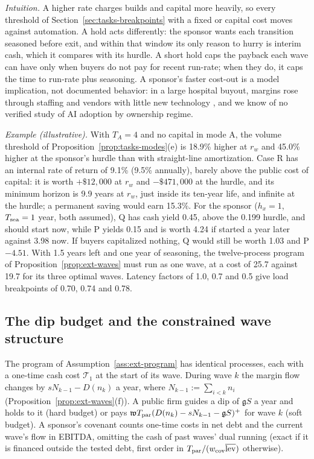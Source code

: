 \noindent\emph{Intuition.} A higher rate charges builds and capital more heavily, so every threshold of Section~\ref{sec:tasks-breakpoints} with a fixed or capital cost moves against automation. A hold acts differently: the sponsor wants each transition seasoned before exit, and within that window its only reason to hurry is interim cash, which it compares with its hurdle. A short hold caps the payback each wave can have only when buyers do not pay for recent run-rate; when they do, it caps the time to run-rate plus seasoning. A sponsor's faster cost-out is a model implication, not documented behavior: in a large hospital buyout, margins rose through staffing and vendors with little new technology \citep{richards2024managing}, and we know of no verified study of AI adoption by ownership regime.

\noindent\emph{Example (illustrative).} With $T_A=4$ and no capital in mode A, the volume threshold of Proposition~\ref{prop:tasks-modes}(e) is 18.9\% higher at $r_w$ and 45.0\% higher at the sponsor's hurdle than with straight-line amortization. Case R has an internal rate of return of 9.1\% (9.5\% annually), barely above the public cost of capital: it is worth $+\$12{,}000$ at $r_w$ and $-\$471{,}000$ at the hurdle, and its minimum horizon is 9.9 years at $r_w$, just inside its ten-year life, and infinite at the hurdle; a permanent saving would earn 15.3\%. For the sponsor ($h_x=1$, $T_{\rm sea}=1$ year, both assumed), Q has cash yield 0.45, above the 0.199 hurdle, and should start now, while P yields 0.15 and is worth 4.24 if started a year later against 3.98 now. If buyers capitalized nothing, Q would still be worth 1.03 and P $-4.51$. With 1.5 years left and one year of seasoning, the twelve-process program of Proposition~\ref{prop:ext-waves} must run as one wave, at a cost of 25.7 against 19.7 for its three optimal waves. Latency factors of 1.0, 0.7 and 0.5 give load breakpoints of 0.70, 0.74 and 0.78.

\subsection{The dip budget and the constrained wave structure}\label{sec:regimes-dip}

\begin{assumption}\label{ass:reg-dip}
The program of Assumption~\ref{ass:ext-program} has identical processes, each with a one-time cash cost $\mathcal T_1$ at the start of its wave. During wave $k$ the margin flow changes by $sN_{k-1}-D(n_k)$ a year, where $N_{k-1}:=\sum_{i<k}n_i$ (Proposition~\ref{prop:ext-waves}(f)). A public firm guides a dip of $\mathfrak gS$ a year and holds to it (hard budget) or pays $\mathfrak w T_{\rm par}(D(n_k)-sN_{k-1}-\mathfrak gS)^+$ for wave $k$ (soft budget). A sponsor's covenant counts one-time costs in net debt and the current wave's flow in EBITDA, omitting the cash of past waves' dual running (exact if it is financed outside the tested debt, first order in $T_{\rm par}/(w_{\rm cov}\overline{\rm lev})$ otherwise).
\end{assumption}

